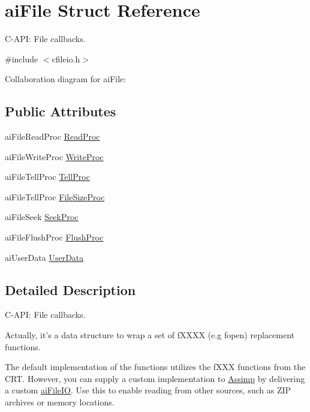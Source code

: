 \hypertarget{structai_file}{\section{ai\-File Struct Reference}
\label{structai_file}
}


C-\/\-A\-P\-I\-: File callbacks.  




{\ttfamily \#include $<$cfileio.\-h$>$}



Collaboration diagram for ai\-File\-:
\subsection*{Public Attributes}
\begin{DoxyCompactItemize}
\item 
ai\-File\-Read\-Proc \hyperlink{structai_file_a52287e81ca67b9d43cc1ce6142f781fa}{Read\-Proc}
\item 
ai\-File\-Write\-Proc \hyperlink{structai_file_ab9fca3a62e34a33592c13a6f31db7d1d}{Write\-Proc}
\item 
ai\-File\-Tell\-Proc \hyperlink{structai_file_aaf2d88a3b2fcbdacf51119658283d27e}{Tell\-Proc}
\item 
ai\-File\-Tell\-Proc \hyperlink{structai_file_aff2fff8c0458e7ec71f7de217c3a3033}{File\-Size\-Proc}
\item 
ai\-File\-Seek \hyperlink{structai_file_a7a07b499be4ad433669246479a4d4ad2}{Seek\-Proc}
\item 
ai\-File\-Flush\-Proc \hyperlink{structai_file_a1102d28d1c0be68ffed20476669bdb0d}{Flush\-Proc}
\item 
ai\-User\-Data \hyperlink{structai_file_aec528fa18f4755fe4f28d604fde28aad}{User\-Data}
\end{DoxyCompactItemize}


\subsection{Detailed Description}
C-\/\-A\-P\-I\-: File callbacks. 

Actually, it's a data structure to wrap a set of f\-X\-X\-X\-X (e.\-g fopen) replacement functions.

The default implementation of the functions utilizes the f\-X\-X\-X functions from the C\-R\-T. However, you can supply a custom implementation to \hyperlink{namespace_assimp}{Assimp} by delivering a custom \hyperlink{structai_file_i_o}{ai\-File\-I\-O}. Use this to enable reading from other sources, such as Z\-I\-P archives or memory locations. 

